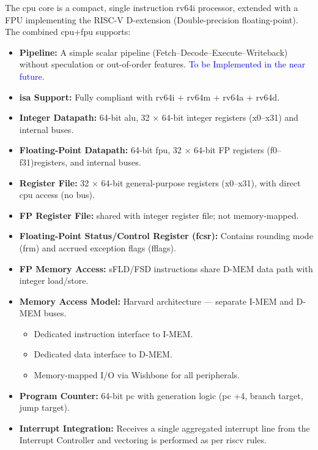 The \gls{cpu} core is a compact, single instruction \gls{rv64i}
processor, extended with a FPU implementing the RISC-V D-extension
(Double-precision floating-point). The combined \gls{cpu}+\gls{fpu} supports:

\begin{itemize}
      \item \textbf{Pipeline:} A simple scalar \gls{pipeline} (Fetch–Decode–Execute–Writeback) without speculation or out-of-order features. \textcolor{blue}{To be Implemented in the near future.}
      \item \textbf{\gls{isa} Support:} Fully compliant with \gls{rv64i} + \gls{rv64m} + \gls{rv64a} + \gls{rv64d}.
      \item \textbf{Integer Datapath:} 64-bit \gls{alu}, 32 × 64-bit integer registers (x0–x31) and internal buses.
      \item \textbf{Floating-Point Datapath:} 64-bit \gls{fpu}, 32 × 64-bit FP registers (f0–f31)registers, and internal buses.
      \item \textbf{Register File:} 32 × 64-bit general-purpose registers (x0–x31), with direct \gls{cpu} access (no bus).
      \item \textbf{FP Register File:} shared with integer register file; not memory-mapped.
      \item \textbf{Floating-Point Status/Control Register (fcsr):} Contains rounding mode (frm) and accrued exception flags (fflags).
      \item \textbf{FP Memory Access:} sFLD/FSD instructions share D-MEM data path with integer load/store.
      \item \textbf{Memory Access Model:} \gls{Harvard} architecture — separate \gls{I-MEM} and \gls{D-MEM} buses.
            \begin{itemize}
                  \item Dedicated instruction interface to \gls{I-MEM}.
                  \item Dedicated data interface to \gls{D-MEM}.
                  \item Memory-mapped I/O via Wishbone for all peripherals.
            \end{itemize}
      \item \textbf{Program Counter:} 64-bit \gls{pc} with generation logic (\gls{pc} +4, branch target, jump target).
      \item \textbf{Interrupt Integration:} Receives a single aggregated interrupt line from the Interrupt Controller
            and vectoring is performed as per \gls{riscv} rules.
\end{itemize}




